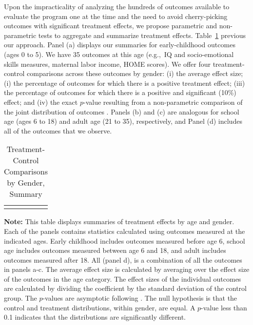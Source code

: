 Upon the impracticality of analyzing the hundreds of outcomes available to evaluate the program one at the time and the need to avoid cherry-picking outcomes with significant treatment effects, we propose parametric and non-parametric tests to aggregate and summarize treatment effects. Table~\ref{table:summary} previous our approach. Panel (a) displays our summaries for early-childhood outcomes (ages 0 to 5). We have 35 outcomes at this age (e.g.,\ IQ and socio-emotional skills measures, maternal labor income, HOME scores). We offer four treatment-control comparisons across these outcomes by gender: (i) the average effect size; (i) the percentage of outcomes for which there is a positive treatment effect; (iii) the percentage of outcomes for which there is a positive and significant (10\%) effect; and (iv) the exact $p$-value resulting from a non-parametric comparison of the joint distribution of outcomes \citep{Rosenbaum_2005_Distribution_JRSS}. Panels (b) and (c) are analogous for school age (ages 6 to 18) and adult age (21 to 35), respectively, and Panel (d) includes all of the outcomes that we observe.

\begin{table}[!htpb]
\begin{threeparttable}
\caption{Treatment-Control Comparisons by Gender, Summary} \label{table:summary}
\centering 
\begin{tabularx}{16.5cm}{XcX}
&  & 
\end{tabularx}
\begin{tablenotes}
\footnotesize
\item \textbf{Note:} This table displays summaries of treatment effects by age and gender. Each of the panels contains statistics calculated using outcomes measured at the indicated ages. Early childhood includes outcomes measured before age 6, school age includes outcomes measured between age 6 and 18, and adult includes outcomes measured after 18. All (panel d), is a combination of all the outcomes in panels a-c. The average effect size is calculated by averaging over the effect size of the outcomes in the age category. The effect sizes of the individual outcomes are calculated by dividing the coefficient by the standard deviation of the control group. The $p$-values are asymptotic following \citet{Rosenbaum_2005_Distribution_JRSS}. The null hypothesis is that the control and treatment distributions, within gender, are equal. A $p$-value less than 0.1 indicates that the distributions are significantly different. 
\end{tablenotes}
\end{threeparttable}
\end{table}

